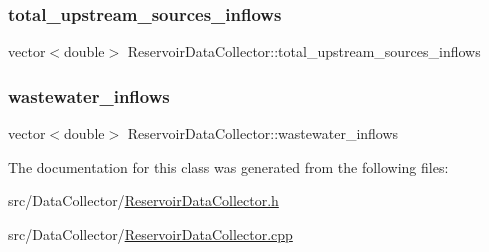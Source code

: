 \subsubsection{\texorpdfstring{total\+\_\+upstream\+\_\+sources\+\_\+inflows}{total\_upstream\_sources\_inflows}}
{\footnotesize\ttfamily vector$<$double$>$ Reservoir\+Data\+Collector\+::total\+\_\+upstream\+\_\+sources\+\_\+inflows\hspace{0.3cm}{\ttfamily [private]}}

\mbox{\label{classReservoirDataCollector_ad923772e45d3ac1151d6cf444fc4bf60_ad923772e45d3ac1151d6cf444fc4bf60}} 
\subsubsection{\texorpdfstring{wastewater\+\_\+inflows}{wastewater\_inflows}}
{\footnotesize\ttfamily vector$<$double$>$ Reservoir\+Data\+Collector\+::wastewater\+\_\+inflows\hspace{0.3cm}{\ttfamily [private]}}



The documentation for this class was generated from the following files\+:\begin{DoxyCompactItemize}
\item 
src/\+Data\+Collector/\mbox{\hyperlink{ReservoirDataCollector_8h}{Reservoir\+Data\+Collector.\+h}}\item 
src/\+Data\+Collector/\mbox{\hyperlink{ReservoirDataCollector_8cpp}{Reservoir\+Data\+Collector.\+cpp}}\end{DoxyCompactItemize}
